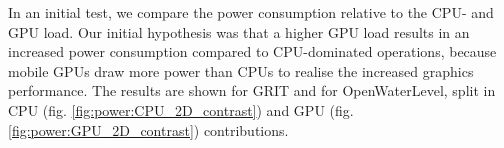 \documentclass[review]{elsarticle}
\begin{document}

In an initial test, we compare the power consumption relative to the \gls{CPU}- and \gls{GPU} load. Our initial hypothesis was that a higher \gls{GPU} load results in an increased power consumption compared to \gls{CPU}-dominated operations, because mobile \glspl{GPU} draw more power than \glspl{CPU} to realise the increased graphics performance. The results are shown for \gls{GRIT} and for OpenWaterLevel, split in \gls{CPU} (fig. \ref{fig:power:CPU_2D_contrast}) and \gls{GPU} (fig. \ref{fig:power:GPU_2D_contrast}) contributions.
\end{document}
